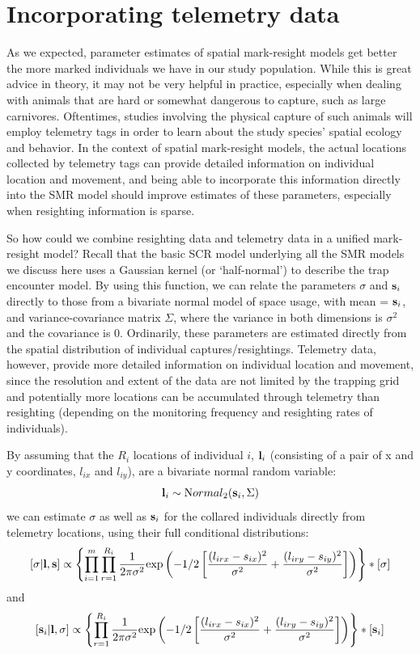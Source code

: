 \section{Incorporating telemetry data}
\label{partialID.sec.telemetry}
As we expected, parameter estimates of spatial mark-resight models get
better the more marked individuals we have in our study
population. While this is great advice in theory, it may not be very
helpful in practice, especially when dealing with animals that are
hard or somewhat dangerous to capture, such as large
carnivores. Oftentimes, studies involving the physical capture of such
animals will employ telemetry tags in order to learn about the study
species' spatial ecology and behavior. In the context of spatial
mark-resight models, the actual locations
collected by telemetry tags can provide detailed information on individual location and movement, and being able to incorporate this information directly into the SMR model should improve estimates of these parameters, especially when resighting information is sparse.

So how could we combine resighting data and telemetry data in a unified mark-resight model? Recall that the basic SCR model underlying all the SMR models we discuss here uses a Gaussian kernel (or `half-normal') to describe the trap encounter model.
By using this function, we can relate the parameters $\sigma$ and ${\bf s}_{i}$ directly to those from a bivariate normal model of space usage, with mean = ${\bf s}_{i}$, and variance-covariance matrix $\Sigma$, where the variance in both dimensions is $\sigma^2$ and the covariance is 0. Ordinarily, these parameters are estimated directly from the spatial distribution of individual captures/resightings. Telemetry data, however, provide more detailed information on individual location and movement, since the resolution and extent of the data are not limited by the trapping grid and potentially more locations can be accumulated through telemetry than resighting (depending on the monitoring frequency and resighting rates of individuals).

By assuming that the $R_i$ locations of individual $i$, ${\bf l}_{i}$ (consisting of a pair of x and y coordinates, $l_{ix}$ and $l_{iy}$), are a bivariate normal random variable:
\[
{\bf l}_i\sim {\mbox Normal}_2 ({\bf s}_i,\Sigma)
\]
we can estimate $\sigma$ as well as ${\bf s}_{i}$ for the collared individuals directly from telemetry locations, using their full conditional distributions:
\[
[\sigma|{\bf l},{\bf s}] \propto \left\{\prod_{i=1}^m \prod_{r=1}^{R_{i}} \frac{1}{2 \pi \sigma^2} {\exp}\left(-1/2 \left[ \frac {(l_{irx}-s_{ix})^2} {\sigma^2} + \frac{(l_{iry}-s_{iy})^2}{\sigma^2} \right]\right)\right\}*[\sigma]
\]
and
\[
[{\bf s}_i|{\bf l},\sigma] \propto \left\{\prod_{r=1}^{R_{i}} \frac{1}{2 \pi \sigma^2} {\exp}\left(-1/2 \left[ \frac {(l_{irx}-s_{ix})^2} {\sigma^2} + \frac{(l_{iry}-s_{iy})^2}{\sigma^2} \right]\right)\right\}*[{\bf s}_{i}]
\]

